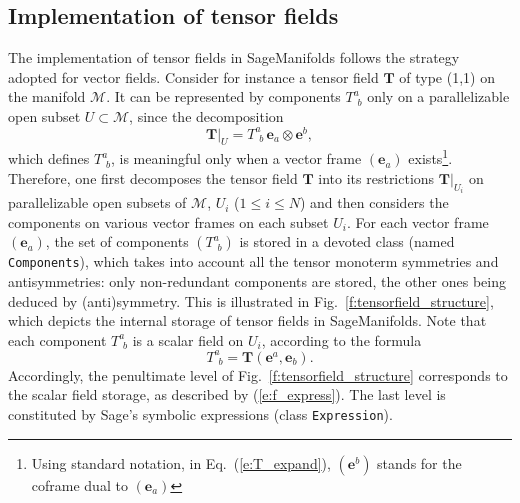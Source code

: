 \documentclass[a4paper]{jpconf}
\newcommand{\soft}[1]{\textsf{#1}}
\newcommand{\code}[1]{\texttt{#1}}
\newcommand{\Sage}{\soft{Sage}}
\newcommand{\SM}{\soft{SageManifolds}}
\newcommand{\be}{\begin{equation}}
\newcommand{\ee}{\end{equation}}
\newcommand{\w}[1]{\bm{#1}}
\begin{document}
\subsection{Implementation of tensor fields}

The implementation of tensor fields in \SM{} follows the strategy 
adopted for vector fields. Consider for instance a tensor field $\w{T}$ 
of type (1,1) on the manifold $\mathcal{M}$. 
It can be represented by 
components $T^a_{\ \, b}$ only on a parallelizable open subset $U\subset
\mathcal{M}$, since the decomposition 
\be \label{e:T_expand}
    \left. \w{T} \right| _{U} = T^a_{\ \, b} \, \w{e}_a \otimes \w{e}^b ,
\ee
which defines $T^a_{\ \, b}$, is meaningful only when a vector frame 
$(\w{e}_a)$ exists\footnote{Using standard notation, in Eq.~(\ref{e:T_expand}),
$(\w{e}^b)$ stands for the coframe dual to $(\w{e}_a)$}.
Therefore, one first decomposes the tensor field $\w{T}$  into 
its restrictions $\left. \w{T} \right| _{U_i}$ on parallelizable open subsets
of $\mathcal{M}$, $U_i$ ($1\leq i\leq N$) and then considers 
the components on various vector frames on each subset $U_i$.
For each vector frame $(\w{e}_a)$, the set of components $(T^a_{\ \, b})$
is stored in a devoted class (named \code{Components}), which takes into account
all the tensor monoterm symmetries and antisymmetries: only non-redundant
components are stored, the other ones being deduced by (anti)symmetry. 
This is illustrated in Fig.~\ref{f:tensorfield_structure}, which depicts the
internal storage of tensor fields in \SM{}. Note that each component
$T^a_{\ \, b}$ is a scalar field on $U_i$, according to the formula
\be
    T^a_{\ \, b} = \w{T}(\w{e}^a, \w{e}_b) . 
\ee
Accordingly, the penultimate level of Fig.~\ref{f:tensorfield_structure} 
corresponds to the scalar field storage, as described by (\ref{e:f_express}).
The last level is constituted by \Sage{}'s symbolic expressions
(class \code{Expression}). 
\end{document}
